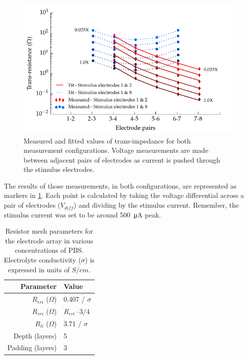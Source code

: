       \begin{figure}
        \centering
        \includegraphics{content/pt2/07-InterfaceModel/graphics/graph_transimpedance_pbs}
        \caption{\label{fig:pt2-graph_transimpedance_pbs}Measured and fitted values of trans-impedance for both measurement configurations. Voltage measurements are made between adjacent pairs of electrodes as current is pushed through the stimulus electrodes.}
      \end{figure}
      The results of those measurements, in both configurations, are represented as markers in \cref{fig:pt2-graph_transimpedance_pbs}.
      Each point is calculated by taking the voltage differential across a pair of electrodes ($V_{diff}$) and dividing by the stimulus current.
      Remember, the stimulus current was set to be around \SI{500}{\micro\ampere} peak.
      \begin{table}
        \centering
        \begin{tabular}{r | l}
          Parameter & Value \\
          \hline
          $R_{eri}$ ($\Omega$)& 0.407 / $\sigma$\\
          $R_{sri}$ ($\Omega$)& $R_{eri}\cdot 3/4$\\
          $R_{li}$ ($\Omega$)& 3.71 / $\sigma$ \\
          Depth (layers) & 5 \\
          Padding (layers) & 3 \\
        \end{tabular}
        \caption{\label{tab:RESparams}Resistor mesh parameters for the electrode array in various concentrations of PBS. Electrolyte conductivity ($\sigma$) is expressed in units of $S / cm$.}
      \end{table}

